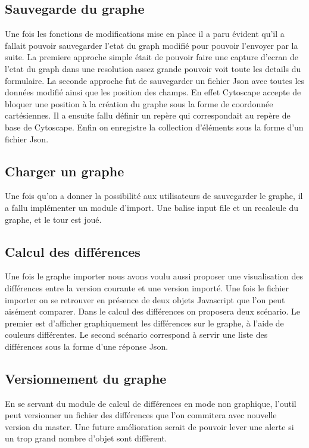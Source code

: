 \subsection{Sauvegarde du graphe}
Une fois les fonctions de modifications mise en place il a paru évident qu’il a fallait pouvoir sauvegarder l’etat du graph modifié pour pouvoir l’envoyer par la suite.
La premiere approche simple était de pouvoir faire une capture d’ecran de l’etat du graph dans une resolution assez grande pouvoir voit toute les details du formulaire.
La seconde approche fut de sauvegarder un fichier Json avec toutes les données modifié ainsi que les position des champs. En effet Cytoscape accepte de bloquer une position à la création du graphe sous la forme de coordonnée cartésiennes. Il a ensuite fallu définir un repère qui correspondait au repère de base de Cytoscape. Enfin on enregistre la collection d'éléments sous la forme d'un fichier Json.

\subsection{Charger un graphe}
Une fois qu'on a donner la possibilité aux utilisateurs de sauvegarder le graphe, il a fallu implémenter un module d’import. Une balise input file et un recalcule du graphe, et le tour est joué.

\subsection{Calcul des différences}
Une fois le graphe importer nous avons voulu aussi proposer une visualisation des différences entre la version courante et une version importé. Une fois le fichier importer on se retrouver en présence de deux objets Javascript que l'on peut aisément comparer. Dans le calcul des différences on proposera deux scénario. Le premier est d'afficher graphiquement les différences sur le graphe, à l'aide de couleurs différentes. Le second scénario correspond à servir une liste des différences sous la forme d'une réponse Json.

\subsection{Versionnement du graphe}
En se servant du module de calcul de différences en mode non graphique, l'outil peut versionner un fichier des différences que l'on commitera avec nouvelle version du master. Une future amélioration serait de pouvoir lever une alerte si un trop grand nombre d'objet sont diffèrent.

